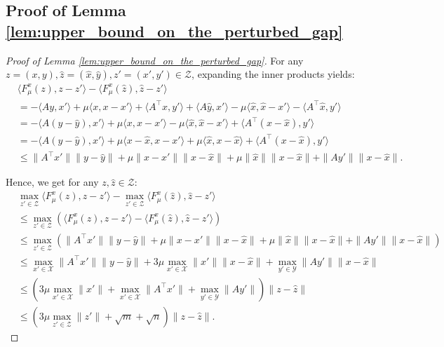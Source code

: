 \documentclass{article}
\newcommand{\X}{\mathcal{X}}
\newcommand{\Y}{\mathcal{Y}}
\newcommand{\Z}{\mathcal{Z}}
\theoremstyle{plain}
\begin{document}
\subsection{Proof of Lemma \ref{lem:upper_bound_on_the_perturbed_gap}}
\begin{proof}[Proof of Lemma \ref{lem:upper_bound_on_the_perturbed_gap}]
    For any $z = (x, y), \hat{z} = (\hat{x}, \hat{y}), z' = (x', y')\in \Z$, expanding the inner products yields:
    \begin{align*}
        & \langle F_{\mu}^x(z), z - z'\rangle - \langle F_{\mu}^x(\hat{z}), \hat{z} - z'\rangle                                                                                                                  \\
        & = -\langle Ay, x'\rangle + \mu \langle  x, x - x'\rangle + \langle A^{\top}x, y'\rangle + \langle A\hat{y}, x'\rangle - \mu \langle  \hat{x}, \hat{x} - x'\rangle - \langle A^{\top}\hat{x}, y'\rangle \\
        & = -\langle A(y - \hat{y}), x'\rangle + \mu \langle  x, x - x'\rangle - \mu \langle  \hat{x}, \hat{x} - x'\rangle + \langle A^{\top}(x - \hat{x}), y'\rangle                                            \\
        & = -\langle A(y - \hat{y}), x'\rangle + \mu \langle  x - \hat{x}, x - x'\rangle + \mu \langle \hat{x}, x - \hat{x}\rangle + \langle A^{\top}(x - \hat{x}), y'\rangle                                    \\
        & \leq \|A^{\top}x'\| \|y - \hat{y}\| + \mu \|x - x'\| \|x - \hat{x}\| + \mu \|\hat{x}\| \|x - \hat{x}\| + \|Ay'\| \|x - \hat{x}\|.
    \end{align*}

    Hence, we get for any $z, \hat{z}\in \Z$:
    \begin{align*}
        & \max_{z'\in \Z}\langle F_{\mu}^x(z), z - z'\rangle - \max_{z'\in \Z}\langle F_{\mu}^x(\hat{z}), \hat{z} - z'\rangle                                          \\
        & \leq \max_{z'\in \Z}\left(\langle F_{\mu}^x(z), z - z'\rangle - \langle F_{\mu}^x(\hat{z}), \hat{z} - z'\rangle\right)                                       \\
        & \leq \max_{z'\in \Z}\left(\|A^{\top}x'\| \|y - \hat{y}\| + \mu \|x - x'\| \|x - \hat{x}\| + \mu \|\hat{x}\| \|x - \hat{x}\| + \|Ay'\| \|x - \hat{x}\|\right) \\
        & \leq \max_{x'\in \X}\|A^{\top}x'\| \|y - \hat{y}\| + 3 \mu \max_{x'\in \X}\|x'\| \|x - \hat{x}\| + \max_{y'\in \Y}\|Ay'\| \|x - \hat{x}\|                    \\
        & \leq \left(3\mu\max_{x'\in \X}\|x'\| + \max_{x'\in \X}\|A^{\top}x'\| + \max_{y'\in \Y}\|Ay'\|\right) \|z - \hat{z}\|                                         \\
        & \leq \left(3\mu\max_{z'\in \Z}\|z'\| + \sqrt{m} + \sqrt{n}\right) \|z - \hat{z}\|.
    \end{align*}


\end{proof}
\end{document}
